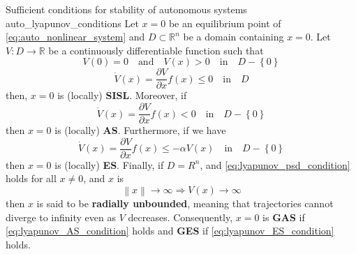 \begin{theorem}[list text=Sufficient conditions for stability of autonomous systems,after pre=\footnotetext{Theorem 4.1 and 4.10 of \cite{khalilNonlinearSystems2002} and theorem 3.3 \cite{khalilNonlinearControl2015} were slightly adjusted and combined to improve clarity.}]{Sufficient conditions for stability of autonomous systems \cite{khalilNonlinearSystems2002}\footnotemark}{auto_lyapunov_conditions}
  Let $x = 0$ be an equilibrium point of \eqref{eq:auto_nonlinear_system} and $D \subset\mathbb{R}^n$ be a domain containing $x = 0$. Let $V: D \rightarrow \mathbb{R}$ be a continuously differentiable function such that
  \begin{equation} \label{eq:lyapunov_psd_condition}
    V \left( 0 \right) = 0 \quad \textrm{and} \quad V \left( x \right)> 0 \quad \textrm{in} \quad D -\left\{ 0 \right\}
  \end{equation}
  \begin{equation}
    \dot{ V }\left( x \right) = \frac{\partial V}{\partial x} f \left( x \right)\le 0 \quad \textrm{in} \quad D
  \end{equation}
  then, $x = 0$ is (locally) \textbf{SISL}. Moreover, if
  \begin{equation} \label{eq:lyapunov_AS_condition}
    \dot{ V }\left( x \right) = \frac{\partial V}{\partial x} f \left( x \right)< 0 \quad \textrm{in} \quad D - \left\{ 0 \right\}
  \end{equation}
  then $x = 0$ is (locally) \textbf{AS}. Furthermore, if we have
  \begin{equation} \label{eq:lyapunov_ES_condition}
    \dot{ V }\left( x \right) = \frac{\partial V}{\partial x} f \left( x \right)\le- \alpha V \left( x \right) \quad \textrm{in} \quad D - \left\{ 0 \right\}
  \end{equation}
  then $x = 0$ is (locally) \textbf{ES}. Finally, if $D = R^n$, and \eqref{eq:lyapunov_psd_condition} holds for all $x \neq 0$, and $x$ is
  \begin{equation}
    \left\| x \right\| \rightarrow \infty \Rightarrow V\left(x\right) \rightarrow \infty
  \end{equation}
  then $x$ is said to be \textbf{radially unbounded}, meaning that trajectories cannot diverge to infinity even as $V$ decreases. Consequently, $x = 0$ is \textbf{GAS} if \eqref{eq:lyapunov_AS_condition} holds and \textbf{GES} if \eqref{eq:lyapunov_ES_condition} holds.
\end{theorem}


